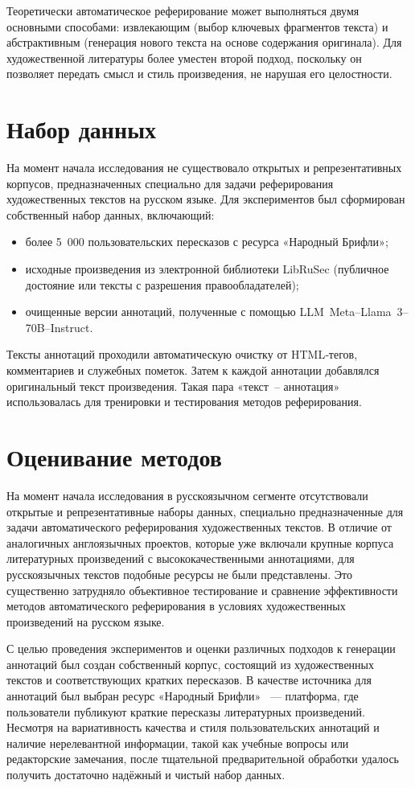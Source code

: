 \documentclass{article}
\theoremstyle{definition}
\theoremstyle{plain}
\begin{document}
Теоретически автоматическое реферирование может выполняться двумя основными способами: извлекающим (выбор ключевых фрагментов текста) и абстрактивным (генерация нового текста на основе содержания оригинала). Для художественной литературы более уместен второй подход, поскольку он позволяет передать смысл и стиль произведения, не нарушая его целостности.

\section*{Набор данных}
На момент начала исследования не существовало открытых и репрезентативных корпусов, предназначенных специально для задачи реферирования художественных текстов на русском языке. Для экспериментов был сформирован собственный набор данных, включающий:
\begin{itemize}
  \item более 5~000 пользовательских пересказов с ресурса «Народный Брифли»;
  \item исходные произведения из электронной библиотеки LibRuSec (публичное достояние или тексты с разрешения правообладателей);
  \item очищенные версии аннотаций, полученные с помощью LLM~Meta--Llama~3--70B--Instruct.
\end{itemize}
Тексты аннотаций проходили автоматическую очистку от HTML‑тегов, комментариев и служебных пометок. Затем к каждой аннотации добавлялся оригинальный текст произведения. Такая пара «текст – аннотация» использовалась для тренировки и тестирования методов реферирования.

\section*{Оценивание методов}
На момент начала исследования в русскоязычном сегменте отсутствовали открытые и репрезентативные наборы данных, специально предназначенные для задачи автоматического реферирования художественных текстов.
В отличие от аналогичных англоязычных проектов, которые уже включали крупные корпуса литературных произведений с высококачественными аннотациями, для русскоязычных текстов подобные ресурсы не были представлены. 
Это существенно затрудняло объективное тестирование и сравнение эффективности методов автоматического реферирования в условиях художественных произведений на русском языке.

С целью проведения экспериментов и оценки различных подходов к генерации аннотаций был создан собственный корпус, состоящий из художественных текстов и соответствующих кратких пересказов. 
В качестве источника для аннотаций был выбран ресурс «Народный Брифли»~\cite{Briefly} — платформа, где пользователи публикуют краткие пересказы литературных произведений. 
Несмотря на вариативность качества и стиля пользовательских аннотаций и наличие нерелевантной информации, такой как учебные вопросы или редакторские замечания, после тщательной предварительной обработки удалось получить достаточно надёжный и чистый набор данных.
\end{document}
